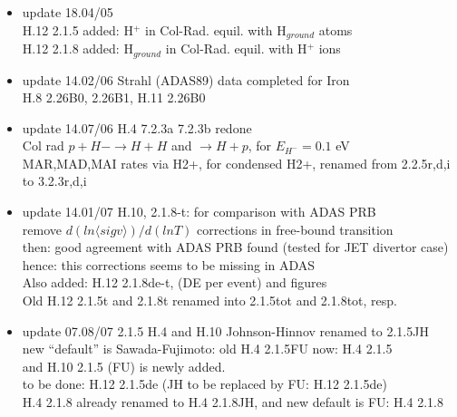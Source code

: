 \documentclass[12pt,dvips]{article}
\begin{document}
\begin{itemize}
  H.11  2.0a, 2.0b  redone, correct $E_{H2}=0.1$ eV\\
  H.11 7.0c renamed to H.11 7.0a\\
  H.12 2.0a, 2.0b and 2.0c fits and plots new, $E_{H2}=0.1$ eV\\
  H.4  2.2.5r, 2.2.5d, 2.2.5i fits and plots, MAR, MAD and MAI rate coeff.\\
  H.3  3.2.3 new, $E_{H2}$ consistent for all H2(v) \\
  H.2  3.2.3 and 2.2.17 redone, $E_{H2}= 0.1$
 \item update  18.04/05 \\
  H.12 2.1.5 added: H$^+$ in Col-Rad. equil. with H$_{ground}$ atoms\\
  H.12 2.1.8 added: H$_{ground}$ in Col-Rad. equil. with H$^+$ ions\\
 \item update  14.02/06 Strahl (ADAS89) data completed for Iron \\
  H.8 2.26B0, 2.26B1, H.11 2.26B0
 \item update  14.07/06 H.4 7.2.3a 7.2.3b redone\\
  Col rad $p + H- \rightarrow H+H$ and $\rightarrow H + p$, for $E_{H^-}=0.1$ eV\\
  MAR,MAD,MAI rates via H2+, for condensed H2+, renamed from 2.2.5r,d,i to 3.2.3r,d,i
 \item update  14.01/07 H.10, 2.1.8-t: for comparison with ADAS PRB \\
  remove $d(ln\langle sigv\rangle)/d(ln T)$ corrections in free-bound transition\\
  then: good agreement with ADAS PRB found (tested for JET divertor case)\\
  hence: this corrections seems to be missing in ADAS\\
  Also added: H.12 2.1.8de-t, (DE per event) and figures \\
  Old H.12 2.1.5t and 2.1.8t renamed into 2.1.5tot and 2.1.8tot, resp.
  \item update   07.08/07  2.1.5 H.4 and H.10 Johnson-Hinnov renamed to 2.1.5JH\\
  new ``default'' is Sawada-Fujimoto: old H.4 2.1.5FU now: H.4 2.1.5\\
  and H.10 2.1.5  (FU) is newly added.\\
  to be done: H.12 2.1.5de  (JH to be replaced by FU: H.12 2.1.5de)\\
  H.4 2.1.8 already renamed to H.4 2.1.8JH, and new default is FU: H.4 2.1.8\\

\end{itemize}
\end{document}
